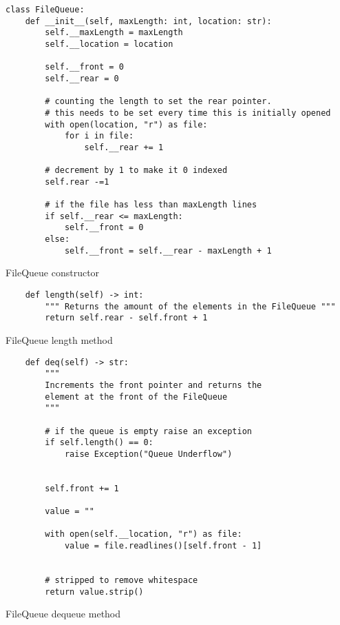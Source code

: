 \newpage
\begin{listing}[!ht]
    \begin{verbatim}
class FileQueue:
    def __init__(self, maxLength: int, location: str):
        self.__maxLength = maxLength
        self.__location = location
        
        self.__front = 0
        self.__rear = 0
        
        # counting the length to set the rear pointer. 
        # this needs to be set every time this is initially opened
        with open(location, "r") as file:
            for i in file:
                self.__rear += 1
                
        # decrement by 1 to make it 0 indexed
        self.rear -=1
                
        # if the file has less than maxLength lines
        if self.__rear <= maxLength:
            self.__front = 0
        else:
            self.__front = self.__rear - maxLength + 1
    \end{verbatim}
    \caption{FileQueue constructor}
    \label{sc:fileq-constructor}
\end{listing}

\newpage
\begin{listing}[!ht]
    \begin{verbatim}
    def length(self) -> int:
        """ Returns the amount of the elements in the FileQueue """
        return self.rear - self.front + 1
    \end{verbatim}
    \caption{FileQueue length method}
    \label{sc:fileq-length-method}
\end{listing}

\newpage
\begin{listing}[!ht]
    \begin{verbatim}
    def deq(self) -> str:
        """ 
        Increments the front pointer and returns the 
        element at the front of the FileQueue 
        """
        
        # if the queue is empty raise an exception
        if self.length() == 0:
            raise Exception("Queue Underflow")
        
        
        self.front += 1
        
        value = ""
        
        with open(self.__location, "r") as file:
            value = file.readlines()[self.front - 1]
            
        
        # stripped to remove whitespace
        return value.strip()
    \end{verbatim}
    \caption{FileQueue dequeue method}
    \label{sc:fileq-deq-method}
\end{listing}

